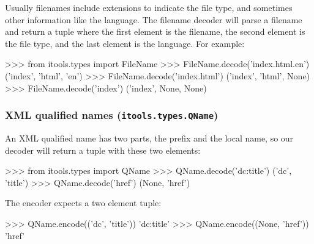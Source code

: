 Usually filenames include extensions to indicate the file type, and
sometimes other information like the language. The filename decoder
will parse a filename and return a tuple where the first element is
the filename, the second element is the file type, and the last element
is the language. For example:

\begin{code}
    >>> from itools.types import FileName
    >>> FileName.decode('index.html.en')
    ('index', 'html', 'en')
    >>> FileName.decode('index.html')
    ('index', 'html', None)
    >>> FileName.decode('index')
    ('index', None, None)
\end{code}


\subsubsection{XML qualified names ({\tt itools.types.QName})}

An XML qualified name has two parts, the prefix and the local name, so
our decoder will return a tuple with these two elements:

\begin{code}
    >>> from itools.types import QName
    >>> QName.decode('dc:title')
    ('dc', 'title')
    >>> QName.decode('href')
    (None, 'href')
\end{code}

The encoder expects a two element tuple:

\begin{code}
    >>> QName.encode(('dc', 'title'))
    'dc:title'
    >>> QName.encode((None, 'href'))
    'href'
\end{code}
